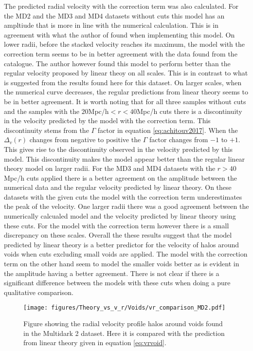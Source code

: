The predicted radial velocity with the correction term was also calculated. For the MD2 and the MD3 and MD4 datasets without cuts this model has an ampltiude that is more in line with the numerical calculation. This is in agreement with what the author of \cite{Achitouv_streaming} found when implementing this model. On lower radii, before the stacked velocity reaches its maximum, the model with the correction term seems to be in better agreement with the data found from the catalogue. The author however found this model to perform better than the regular velocity proposed by linear theoy on all scales. This is in contrast to what is suggested from the results found here for this dataset. On larger scales, when the numerical curve decreases, the regular predictions from linear theory seems to be in better agreement. It is worth noting that for all three samples without cuts and the samples with the $20$Mpc/h$<r<40$Mpc/h cuts there is a discontinuity in the velocity predicted by the model with the correction term. This discontinuity stems from the $\Gamma$ factor in equation \ref{eq:achitouv2017}. When the $\Delta_v(r)$ changes from negative to positive the $\Gamma$ factor changes from $-1$ to $+1$. This gives rise to the discontinuity observed in the velocity predicted by this model. This discontinuity makes the model appear better than the regular linear theory model on larger radii. For the MD3 and MD4 datasets with the $r>40$Mpc/h cuts applied there is a better agreement on the amplitude between the numerical data and the regular velocity predicted by linear theory. On these datasets with the given cuts the model with the correction term underestimates the peak of the velocity. One larger radii there was a good agreement between the numerically calcualed model and the velocity predicted by linear theory using these cuts. For the model with the correction term however there is a small discrepancy on these scales. Overall the these results suggest that the model predicted by linear theory is a better predictor for the velocity of halos around voids when cuts excluding small voids are applied. The model with the correction term on the other hand seem to model the smaller voids better as is evident in the amplitude having a better agreement. There is not clear if there is a significant difference between the models with these cuts when doing a pure qualitative comparison.
\begin{figure}[H]
    \texttt{[image: figures/Theory\_vs\_v\_r/Voids/vr\_comparison\_MD2.pdf]}
    \caption{Figure showing the radial velocity profile halos around voids found in the Multidark 2 dataset. Here it is compared with the prediction from linear theory given in equation \ref{eq:vrvoid}.}
    \label{fig:vrMD2}
\end{figure}

